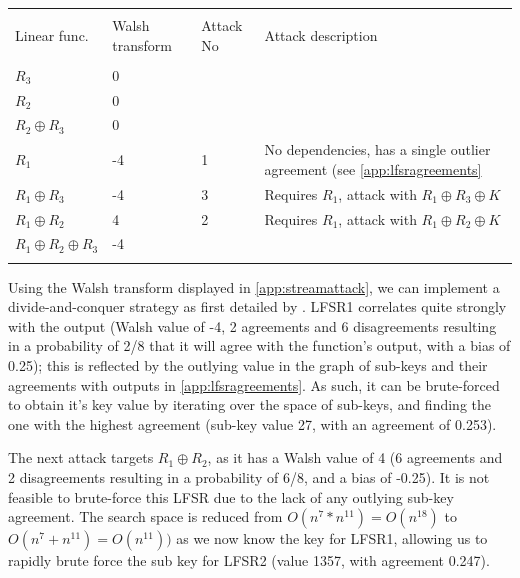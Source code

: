 \documentclass[british,10pt,a4paper]{article}
\begin{document}
\begin{center}
	\begin{tabular}{lllp{6.5cm}}\label{tab:streamattack} \\
		\toprule \\
		Linear func.                  & Walsh transform & Attack No & Attack description                                           \\
		\midrule \\
		\(R_3\) & 0 \\
		\(R_2\)                       & 0               &           &                                                              \\
		\(R_2 \oplus R_3\)            & 0               &           &                                                              \\
		\(R_1\)                       & -4              & 1         & No dependencies, has a single outlier agreement (see \autoref{app:lfsragreements} \\
		\(R_1 \oplus R_3\)            & -4              & 3         & Requires \(R_1\), attack with \(R_1 \oplus R_3 \oplus K\)    \\
		\(R_1 \oplus R_2\)            & 4               & 2         & Requires \(R_1\), attack with \(R_1 \oplus R_2 \oplus K\)    \\
		\(R_1 \oplus R_2 \oplus R_3\) & -4              &           &                                                              \\

		\bottomrule \\
	\end{tabular}
\end{center}
Using the Walsh transform displayed in \autoref{app:streamattack}, we can implement a divide-and-conquer strategy as first detailed by \citet{meider}.
LFSR1 correlates quite strongly with the output (Walsh value of -4, 2 agreements and 6 disagreements resulting in a probability of 2/8 that it will agree with the function's output, with a bias of 0.25); this is reflected by the outlying value in the graph of sub-keys and their agreements with outputs in \autoref{app:lfsragreements}. As such, it can be brute-forced to obtain it's key value by iterating over the space of sub-keys, and finding the one with the highest agreement (sub-key value 27, with an agreement of 0.253).

The next attack targets \(R_1 \oplus R_2\), as it has a Walsh value of 4 (6 agreements and 2 disagreements resulting in a probability of 6/8, and a bias of -0.25). It is not feasible to brute-force this LFSR due to the lack of any outlying sub-key agreement.
The search space is reduced from \(O(n^{7} * n^{11})=O(n^{18})\) to \(O(n^7 + n^{11})=O(n^{11}))\) as we now know the key for LFSR1, allowing us to rapidly brute force the sub key for LFSR2 (value 1357, with agreement 0.247).
\end{document}
